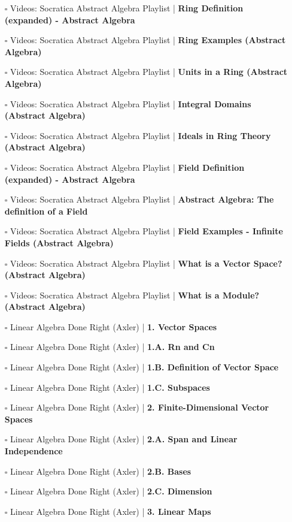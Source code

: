 \documentclass[a4, landscape, 12pt]{article}
\newcommand{\checkbox}{$\square$}%
\begin{document}
\begin{itemize}
{}
\item [\checkbox] Videos: Socratica Abstract Algebra Playlist  | \textbf{Ring Definition (expanded) - Abstract Algebra
}
\item [\checkbox] Videos: Socratica Abstract Algebra Playlist  | \textbf{Ring Examples (Abstract Algebra)
}
\item [\checkbox] Videos: Socratica Abstract Algebra Playlist  | \textbf{Units in a Ring (Abstract Algebra)
}
\item [\checkbox] Videos: Socratica Abstract Algebra Playlist  | \textbf{Integral Domains (Abstract Algebra)
}
\item [\checkbox] Videos: Socratica Abstract Algebra Playlist  | \textbf{Ideals in Ring Theory (Abstract Algebra)
}
\item [\checkbox] Videos: Socratica Abstract Algebra Playlist  | \textbf{Field Definition (expanded) - Abstract Algebra
}
\item [\checkbox] Videos: Socratica Abstract Algebra Playlist  | \textbf{Abstract Algebra: The definition of a Field
}
\item [\checkbox] Videos: Socratica Abstract Algebra Playlist  | \textbf{Field Examples - Infinite Fields (Abstract Algebra)
}
\item [\checkbox] Videos: Socratica Abstract Algebra Playlist  | \textbf{What is a Vector Space? (Abstract Algebra)
}
\item [\checkbox] Videos: Socratica Abstract Algebra Playlist  | \textbf{What is a Module? (Abstract Algebra)
}
\item [\checkbox] Linear Algebra Done Right (Axler)  | \textbf{1. Vector Spaces
}
\item [\checkbox] Linear Algebra Done Right (Axler)  | \textbf{1.A. Rn and Cn
}
\item [\checkbox] Linear Algebra Done Right (Axler)  | \textbf{1.B. Definition of Vector Space
}
\item [\checkbox] Linear Algebra Done Right (Axler)  | \textbf{1.C. Subspaces
}
\item [\checkbox] Linear Algebra Done Right (Axler)  | \textbf{2. Finite-Dimensional Vector Spaces
}
\item [\checkbox] Linear Algebra Done Right (Axler)  | \textbf{2.A. Span and Linear Independence
}
\item [\checkbox] Linear Algebra Done Right (Axler)  | \textbf{2.B. Bases
}
\item [\checkbox] Linear Algebra Done Right (Axler)  | \textbf{2.C. Dimension
}
\item [\checkbox] Linear Algebra Done Right (Axler)  | \textbf{3. Linear Maps
}
\end{itemize}
\end{document}
